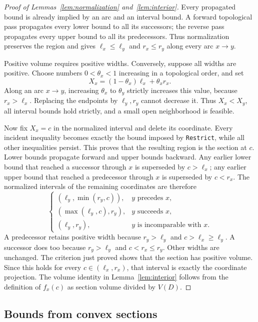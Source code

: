 \begin{proof}[Proof of Lemmas~\ref{lem:normalization} and~\ref{lem:interior}]
Every propagated bound is already implied by an arc and an interval
bound. A forward topological pass propagates every lower bound to all
its successors; the reverse pass propagates every upper bound to all
its predecessors. Thus normalization preserves the region and gives
$\ell_x\le\ell_y$ and $r_x\le r_y$ along every arc $x\to y$.

Positive volume requires positive widths. Conversely, suppose all widths
are positive. Choose numbers $0<\theta_x<1$ increasing in a topological
order, and set
\[
X_x=(1-\theta_x)\ell_x+\theta_xr_x.
\]
Along an arc $x\to y$, increasing $\theta_x$ to $\theta_y$ strictly
increases this value, because $r_x>\ell_x$. Replacing the endpoints by
$\ell_y,r_y$ cannot decrease it. Thus $X_x<X_y$, all interval bounds
hold strictly, and a small open neighborhood is feasible.

Now fix $X_x=c$ in the normalized interval and delete its coordinate.
Every incident inequality becomes exactly the bound imposed by
\texttt{Restrict}, while all other inequalities persist. This proves
that the resulting region is the section at $c$. Lower bounds propagate forward
and upper bounds backward. Any earlier lower bound that reached a
successor through $x$ is superseded by $c>\ell_x$; any earlier upper
bound that reached a predecessor through $x$ is superseded by $c<r_x$.
The normalized intervals of the remaining coordinates are therefore
\begin{equation}\label{eq:section-intervals}
\begin{cases}
(\ell_y,\min(r_y,c)),&y\text{ precedes }x,\\
(\max(\ell_y,c),r_y),&y\text{ succeeds }x,\\
(\ell_y,r_y),&y\text{ is incomparable with }x.
\end{cases}
\end{equation}
A predecessor retains positive width because $r_y>\ell_y$ and
$c>\ell_x\ge\ell_y$. A successor does too because $r_y>\ell_y$ and
$c<r_x\le r_y$. Other widths are unchanged. The criterion just proved
shows that the section has positive volume. Since this holds for every
$c\in(\ell_x,r_x)$, that interval is exactly the coordinate projection. The volume identity
in Lemma~\ref{lem:interior} follows from the definition of $f_x(c)$ as
section volume divided by $V(D)$.
\end{proof}

\subsection{Bounds from convex sections}

